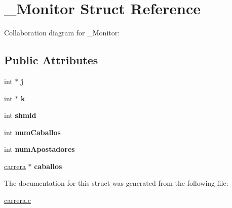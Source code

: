 \hypertarget{struct__Monitor}{}\section{\+\_\+\+Monitor Struct Reference}
\label{struct__Monitor}


Collaboration diagram for \+\_\+\+Monitor\+:
\subsection*{Public Attributes}
\begin{DoxyCompactItemize}
\item 
int $\ast$ {\bfseries j}\hypertarget{struct__Monitor_a8c99fc7fcd474a35e14047b2d46af390}{}\label{struct__Monitor_a8c99fc7fcd474a35e14047b2d46af390}

\item 
int $\ast$ {\bfseries k}\hypertarget{struct__Monitor_ae06ed31d1e98a347e8147b713551fa26}{}\label{struct__Monitor_ae06ed31d1e98a347e8147b713551fa26}

\item 
int {\bfseries shmid}\hypertarget{struct__Monitor_aa927c580f30b2085647032599b6dde4c}{}\label{struct__Monitor_aa927c580f30b2085647032599b6dde4c}

\item 
int {\bfseries num\+Caballos}\hypertarget{struct__Monitor_a5a1c304eaa4f2cca52dc2d5ac937894e}{}\label{struct__Monitor_a5a1c304eaa4f2cca52dc2d5ac937894e}

\item 
int {\bfseries num\+Apostadores}\hypertarget{struct__Monitor_a54944b0b93b7d647fed1a5225e02d40a}{}\label{struct__Monitor_a54944b0b93b7d647fed1a5225e02d40a}

\item 
\hyperlink{struct__Carrera}{carrera} $\ast$ {\bfseries caballos}\hypertarget{struct__Monitor_a4c856b284d47e65fddfa0b3898895489}{}\label{struct__Monitor_a4c856b284d47e65fddfa0b3898895489}

\end{DoxyCompactItemize}


The documentation for this struct was generated from the following file\+:\begin{DoxyCompactItemize}
\item 
\hyperlink{carrera_8c}{carrera.\+c}\end{DoxyCompactItemize}
